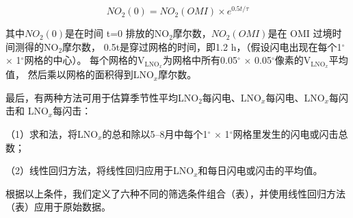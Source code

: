 \begin{equation} \label{eq:inition}
NO_2(0) = NO_2(OMI) \times e^{0.5t/\tau}
\end{equation}

其中$NO_2(0)$是在时间 t=0 排放的NO$_2$摩尔数，$NO_2(OMI)$是在 OMI 过境时间测得的NO$_2$摩尔数，
0.5t是穿过网格的时间，即1.2 h，（假设闪电出现在每个1$^{\circ}$ $\times$ 1$^{\circ}$网格的中心）。
每个网格的V$_\textrm{LNO$_x$}$为网格中所有0.05$^{\circ}$ $\times$ 0.05$^{\circ}$像素的V$_\textrm{LNO$_x$}$平均值，
然后乘以网格的面积得到LNO$_x$摩尔数。

最后，有两种方法可用于估算季节性平均LNO$_2$每闪电、LNO$_x$每闪电、LNO$_x$每闪击和 LNO$_x$每闪击：

（1）求和法，将LNO$_x$的总和除以5--8月中每个1$^{\circ}$ $\times$ 1$^{\circ}$网格里发生的闪电或闪击总数；

（2）线性回归方法，将线性回归应用于LNO$_x$和每日闪电或闪击的平均值。


根据以上条件，我们定义了六种不同的筛选条件组合（表），并使用线性回归方法（表）应用于原始数据。

